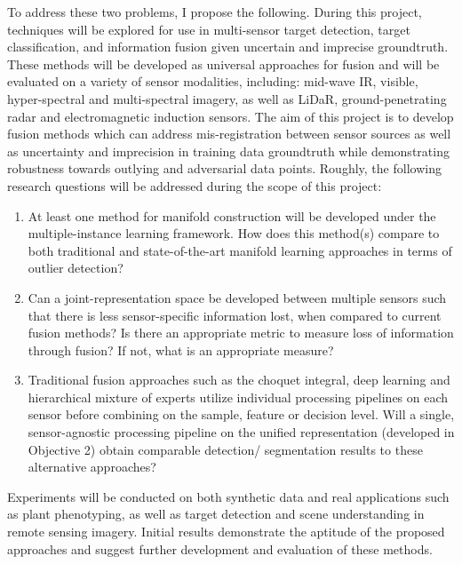 To address these two problems, I propose the following.  During this project, techniques will be explored for use in multi-sensor target detection, target classification, and information fusion given uncertain and imprecise groundtruth.  These methods will be developed as universal approaches for fusion and will be evaluated on a variety of sensor modalities, including: mid-wave IR, visible, hyper-spectral and multi-spectral imagery, as well as LiDaR, ground-penetrating radar and electromagnetic induction sensors.  The aim of this project is to develop fusion methods which can address mis-registration between sensor sources as well as uncertainty and imprecision in training data groundtruth while demonstrating robustness towards outlying and adversarial data points. Roughly, the following research questions will be addressed during the scope of this project:
\begin{enumerate}
	\item At least one method for manifold construction will be developed under the multiple-instance learning framework.  How does this method(s) compare to both traditional and state-of-the-art manifold learning approaches in terms of outlier detection?
	\item Can a joint-representation space be developed between multiple sensors such that there is less sensor-specific information lost, when compared to current fusion methods? Is there an appropriate metric to measure loss of information through fusion?  If not, what is an appropriate measure?
	\item Traditional fusion approaches such as the choquet integral, deep learning and hierarchical mixture of experts utilize individual processing pipelines on each sensor before combining on the sample, feature or decision level.  Will a single, sensor-agnostic processing pipeline on the unified representation (developed in Objective 2) obtain comparable detection/ segmentation results to these alternative approaches?
\end{enumerate} 

Experiments will be conducted on both synthetic data and real applications such as plant phenotyping, as well as target detection and scene understanding in remote sensing imagery. Initial results demonstrate the aptitude of the proposed approaches and suggest further development and evaluation of these methods.

